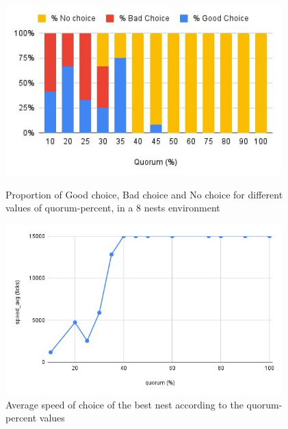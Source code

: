 \documentclass[9pt]{pnas-new}
\begin{document}
\begin{figure}[h]
    \begin{minipage}[c]{.46\linewidth}
        \centering
        \includegraphics[width=0.95\textwidth]{report-template/fig/quorum_bar.jpeg}
        \caption{Proportion of Good choice, Bad choice and No choice for different values of quorum-percent, in a 8 nests environment}
        \label{fig:vr8}
    \end{minipage}
    \hfill%
    \begin{minipage}[c]{.46\linewidth}
        \centering
        \includegraphics[width=0.95\textwidth]{report-template/fig/quorum_diag.jpeg}
        \caption{Average speed of choice of the best nest according to the quorum-percent values}
        \label{fig:c8}
    \end{minipage}
\end{figure}
\end{document}
